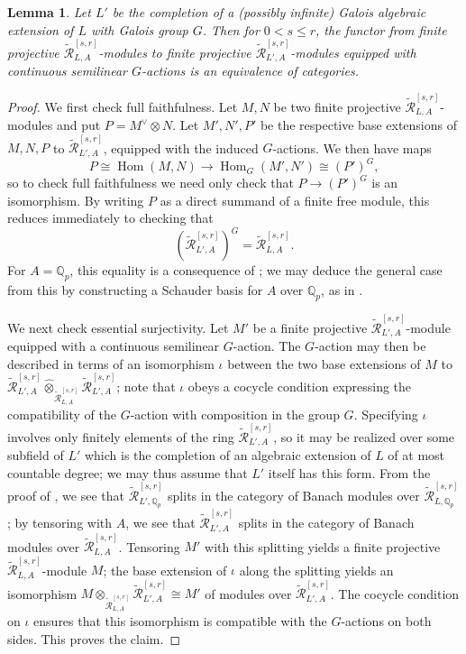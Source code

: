 \documentclass[12pt]{amsart}
\newtheorem{lemma}[theorem]{Lemma}
\theoremstyle{definition}
\numberwithin{equation}{theorem}
\newcommand{\QQ}{\mathbb{Q}}
\newcommand{\calR}{\mathcal{R}}
\newcommand{\dual}{\vee}
\DeclareMathOperator{\Hom}{Hom}
\begin{document}
\begin{lemma} \label{L:Witt module descend}
Let $L'$ be the completion of a (possibly infinite) Galois algebraic extension of $L$ with Galois group $G$. Then for $0 < s \leq r$, the functor from finite projective $\tilde{\calR}^{[s,r]}_{L,A}$-modules to finite projective
$\tilde{\calR}^{[s,r]}_{L',A}$-modules equipped with continuous semilinear $G$-actions is an equivalence of categories.
\end{lemma}
\begin{proof}
We first check full faithfulness.
Let $M,N$ be two finite projective $\tilde{\calR}^{[s,r]}_{L,A}$-modules
and put $P = M^\dual \otimes N$. Let $M',N',P'$ be the respective base extensions of $M,N,P$ to $\tilde{\calR}^{[s,r]}_{L',A}$, equipped with the induced $G$-actions. 
We then have maps
\[
P \cong \Hom(M,N) \to \Hom_G(M',N') \cong (P')^G,
\]
so to check full faithfulness we need only check that $P \to (P')^G$ is an isomorphism.
By writing $P$ as a direct summand of a finite free module, this reduces immediately to checking that 
\[
(\tilde{\calR}^{[s,r]}_{L',A})^G = \tilde{\calR}^{[s,r]}_{L,A}.
\]
For $A = \QQ_p$, this equality is a consequence of \cite[Theorem~9.2.15]{kedlaya-liu1};
we may deduce the general case from this by constructing a Schauder basis for $A$ over $\QQ_p$, as in \cite[Lemma~2.2.9(b)]{kedlaya-liu1}.

We next check essential surjectivity.
Let $M'$ be a finite projective $\tilde{\calR}^{[s,r]}_{L',A}$-module equipped with a continuous semilinear $G$-action. The $G$-action may then be described in terms of an isomorphism $\iota$ between the two base extensions of $M$ to $\tilde{\calR}^{[s,r]}_{L',A} \widehat{\otimes}_{\tilde{\calR}^{[s,r]}_{L,A}} \tilde{\calR}^{[s,r]}_{L',A}$;
note that $\iota$ obeys a cocycle condition expressing the compatibility of the $G$-action with composition in the group $G$. Specifying $\iota$ involves only finitely elements of the ring $\tilde{\calR}^{[s,r]}_{L',A}$, so it may be realized over some subfield of $L'$ which is the completion of an algebraic extension of $L$ of at most countable degree; we may thus assume that $L'$ itself has this form. From the proof of \cite[Theorem~9.2.15]{kedlaya-liu1}, we see that $\tilde{\calR}^{[s,r]}_{L',\QQ_p}$ splits in the category of Banach modules over $\tilde{\calR}^{[s,r]}_{L,\QQ_p}$; by tensoring with $A$, we see that
$\tilde{\calR}^{[s,r]}_{L',A}$ splits in the category of Banach modules over $\tilde{\calR}^{[s,r]}_{L,A}$.
Tensoring $M'$ with this splitting yields a finite projective $\tilde{\calR}^{[s,r]}_{L,A}$-module $M$; the base extension of $\iota$ along the splitting yields an isomorphism
$M \otimes_{\tilde{\calR}^{[s,r]}_{L,A}} \tilde{\calR}^{[s,r]}_{L',A} \cong M'$
of modules over $\tilde{\calR}^{[s,r]}_{L',A}$. The cocycle condition on $\iota$ ensures that this isomorphism is compatible with the $G$-actions on both sides.
This proves the claim.
\end{proof}
\end{document}
